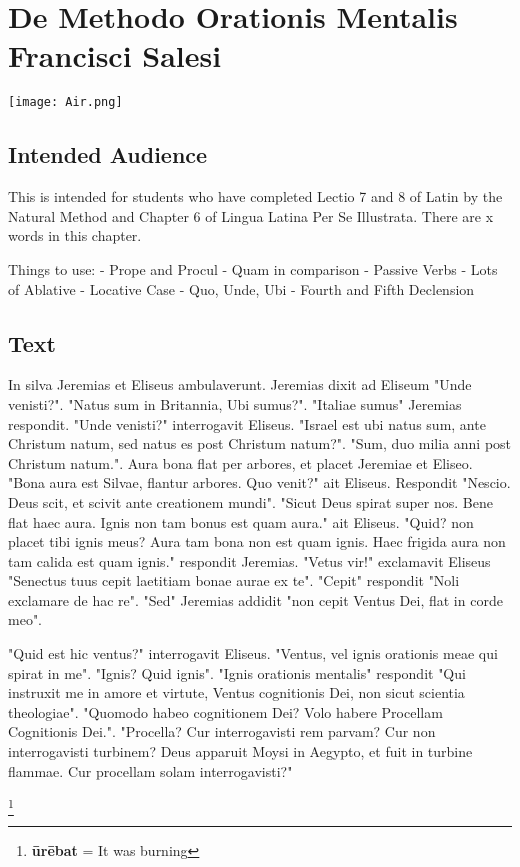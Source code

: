 \chapter{De Methodo Orationis Mentalis Francisci Salesi}
\begin{center}
\texttt{[image: Air.png]}
\end{center}

\section{Intended Audience}
This is intended for students who have completed Lectio 7 and 8 of Latin by the Natural Method and Chapter 6 of Lingua Latina Per Se Illustrata. There are x words in this chapter.

Things to use:
	- Prope and Procul
	- Quam in comparison
	- Passive Verbs
	- Lots of Ablative
	- Locative Case 
	- Quo, Unde, Ubi
	- Fourth and Fifth Declension

\section{Text}
In silva Jeremias et Eliseus ambulaverunt. Jeremias dixit ad Eliseum "Unde venisti?". "Natus sum in Britannia, Ubi sumus?". "Italiae sumus" Jeremias respondit. "Unde venisti?" interrogavit Eliseus. "Israel est ubi natus sum, ante Christum natum, sed natus es post Christum natum?". "Sum, duo milia anni post Christum natum.". Aura bona flat per arbores, et placet Jeremiae et Eliseo. "Bona aura est Silvae, flantur arbores.  Quo venit?" ait Eliseus. Respondit "Nescio. Deus scit, et scivit ante creationem mundi". "Sicut Deus spirat super nos.  Bene flat haec aura. Ignis non tam bonus est quam aura." ait Eliseus. "Quid? non placet tibi ignis meus? Aura tam bona non est quam ignis. Haec frigida aura non tam calida est quam ignis." respondit Jeremias. "Vetus vir!" exclamavit Eliseus "Senectus tuus cepit laetitiam bonae aurae ex te". "Cepit" respondit "Noli exclamare de hac re". "Sed" Jeremias addidit "non cepit Ventus Dei, flat in corde meo". 

"Quid est hic ventus?" interrogavit Eliseus. "Ventus, vel ignis orationis meae qui spirat in me". "Ignis? Quid ignis". "Ignis orationis mentalis" respondit "Qui instruxit me in amore et virtute, Ventus cognitionis Dei, non sicut scientia theologiae". "Quomodo habeo cognitionem Dei? Volo habere Procellam Cognitionis Dei.". "Procella? Cur interrogavisti rem parvam? Cur non interrogavisti turbinem? Deus apparuit Moysi in Aegypto, et fuit in turbine flammae. Cur procellam solam interrogavisti?"   

\footnote{\textbf{ūrēbat} = It was burning}